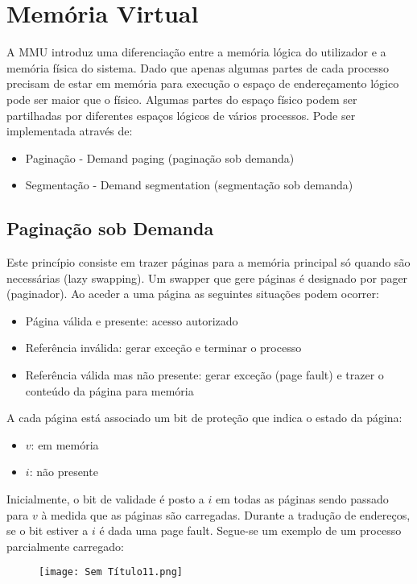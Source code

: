 \documentclass[10pt,a4paper]{report}
\begin{document}
\section{Memória Virtual}
A MMU introduz uma diferenciação entre a memória lógica do utilizador e a memória física do sistema. Dado que apenas algumas partes de cada processo precisam de estar em memória para execução o espaço de endereçamento lógico pode ser maior que o físico. Algumas partes do espaço físico podem ser partilhadas por diferentes espaços lógicos de vários processos. Pode ser implementada através de:
\begin{itemize}
\item Paginação - Demand paging (paginação sob demanda)
\item Segmentação - Demand segmentation (segmentação sob demanda)
\end{itemize}
\subsection{Paginação sob Demanda}
Este princípio consiste em trazer páginas para a memória principal só quando são necessárias (lazy swapping). Um swapper que gere páginas é designado por pager (paginador). Ao aceder a uma página as seguintes situações podem ocorrer:
\begin{itemize}
\item Página válida e presente: acesso autorizado
\item Referência inválida: gerar exceção e terminar o processo
\item Referência válida mas não presente: gerar exceção (page fault) e trazer o conteúdo da página para memória
\end{itemize}
A cada página está associado um bit de proteção que indica o estado da página:
\begin{itemize}
\item $v$: em memória
\item $i$: não presente
\end{itemize}
Inicialmente, o bit de validade é posto a $i$ em todas as páginas sendo passado para $v$ à medida que as páginas são carregadas. Durante a tradução de endereços, se o bit estiver a $i$ é dada uma page fault. Segue-se um exemplo de um processo parcialmente carregado:
\begin{figure}[H]
\centering
\texttt{[image: Sem Título11.png]}
\end{figure}
\end{document}
